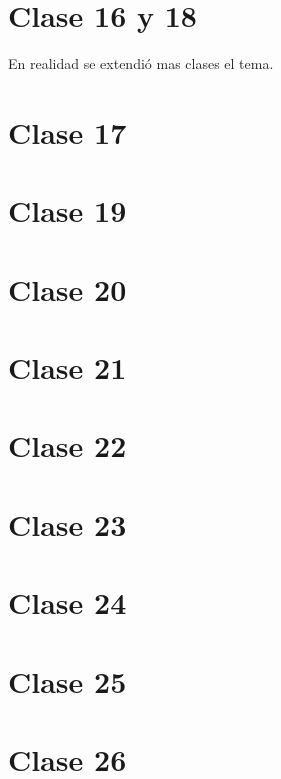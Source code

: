 \documentclass[titlepage,a4paper]{article}
\begin{document}
\section*{Clase 16 y 18}
En realidad se extendió mas clases el tema.


\section*{Clase 17}


\section*{Clase 19}


\section*{Clase 20}


\section*{Clase 21}


\section*{Clase 22}


\section*{Clase 23}


\section*{Clase 24}


\section*{Clase 25}


\section*{Clase 26}

\end{document}
